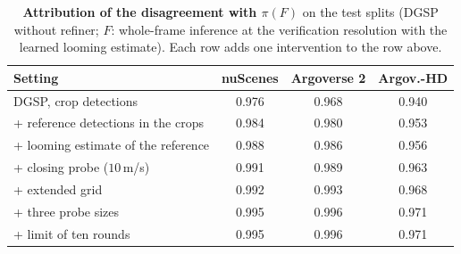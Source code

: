 \documentclass[10pt,letterpaper]{article}
\newcommand{\method}{DGSP\xspace}
\newcommand{\full}{F}
\newcommand{\policy}{\pi}
\theoremstyle{remark}
\theoremstyle{plain}
\theoremstyle{definition}
\begin{document}
\begin{table}[!tbp]
\centering
\caption{\textbf{Attribution of the disagreement with $\policy(\full)$} on the test splits (\method without refiner; $\full$: whole-frame inference at the verification resolution with the learned looming estimate). Each row adds one intervention to the row above.}
\label{tab:locality}
\small
\setlength{\tabcolsep}{3pt}
\begin{tabular}{@{}lccc@{}}
\toprule
Setting & nuScenes & Argoverse 2 & Argov.-HD \\
\midrule
\method, crop detections & 0.976 & 0.968 & 0.940 \\
+ reference detections in the crops & 0.984 & 0.980 & 0.953 \\
+ looming estimate of the reference & 0.988 & 0.986 & 0.956 \\
+ closing probe ($10$\,m/s) & 0.991 & 0.989 & 0.963 \\
+ extended grid & 0.992 & 0.993 & 0.968 \\
+ three probe sizes & 0.995 & 0.996 & 0.971 \\
+ limit of ten rounds & 0.995 & 0.996 & 0.971 \\
\bottomrule
\end{tabular}
\end{table}
\end{document}
